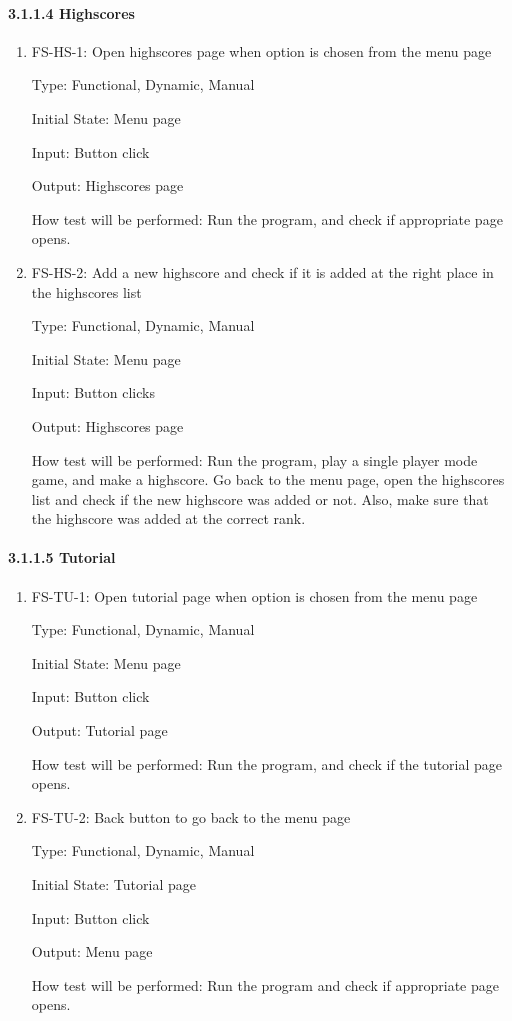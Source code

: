 \documentclass[12pt,letterpaper]{article}
\begin{document}
	\paragraph{3.1.1.4 Highscores}
	\begin{enumerate}
	\item FS-HS-1: Open highscores page when option is chosen from the menu page

	Type: Functional, Dynamic, Manual	

	Initial State: Menu page

	Input: Button click 

	Output: Highscores page

	How test will be performed: Run the program, and check if appropriate page opens.

	\item FS-HS-2: Add a new highscore and check if it is added at the right place in the highscores list

	Type: Functional, Dynamic, Manual

	Initial State: Menu page

	Input: Button clicks 

	Output: Highscores page

	How test will be performed: Run the program, play a single player mode game, and make a highscore. Go back to the menu page, open the highscores list and check if the new highscore was added or not. Also, make sure that the highscore was added at the correct rank.
	\end{enumerate}

	\paragraph{3.1.1.5 Tutorial}
	\begin{enumerate}
	\item FS-TU-1: Open tutorial page when option is chosen from the menu page

	Type: Functional, Dynamic, Manual

	Initial State: Menu page

	Input: Button click 

	Output: Tutorial page

	How test will be performed: Run the program, and check if the tutorial page opens.

	\item FS-TU-2: Back button to go back to the menu page

	Type: Functional, Dynamic, Manual

	Initial State: Tutorial page	

	Input: Button click

	Output: Menu page

	How test will be performed: Run the program and check if appropriate page opens.
	\end{enumerate}
\end{document}
